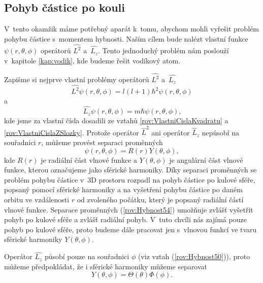 \subsection{Pohyb částice po kouli}
\label{kap:PohybCasticePoKouli}

V~tento okamžik máme potřebný aparát k~tomu, abychom mohli vyřešit problém pohybu částice s~momentem hybnosti. Naším cílem bude nalézt vlastní funkce $\psi(r, \theta, \phi)$ operátorů $\hat{L^2}$ a~$\hat{L_z}$. Tento jednoduchý problém nám poslouží  v~kapitole \ref{kap:vodik}, kde budeme řešit vodíkový atom.

Zapišme si nejprve vlastní problémy operátorů $\hat{L^2}$ a~$\hat{L_z}$
\begin{equation}
\hat{L^2}\psi(r, \theta, \phi) = l(l+1) \hbar^2 \psi(r, \theta, \phi)
\label{rov:Hybnost52}
\end{equation}
a
\begin{equation}
\hat{L_z}\psi(r, \theta, \phi) = m \hbar \psi(r, \theta, \phi) \mbox{,}
\label{rov:Hybnost53}
\end{equation}
kde jsme za vlastní čísla dosadili ze vztahů \eqref{rov:VlastniCislaKvadratu} a \eqref{rov:VlastniCislaZSlozky}. Protože operátor $\hat{L}^2$ ani operátor $\hat{L}_z$ nepůsobí na souřadnici $r$, můžeme provést separaci proměnných
\begin{equation}
\psi(r, \theta, \phi) = R(r) Y (\theta, \phi),
\label{rov:Hybnost54}
\end{equation}
kde $R(r)$ je radiální část vlnové funkce a $Y(\theta,\phi)$ je angulární část vlnové funkce, kterou označujeme jako sférické harmoniky. Díky separaci proměnných se problém pohybu částice v~3D prostoru rozpadl na pohyb částice po kulové sféře, popsaný pomocí sférické harmoniky a na vyšetření pohybu částice po daném orbitu ve vzdálenosti $r$ od zvoleného počátku, který je popsaný radiální částí vlnové funkce. Separace proměnných (\ref{rov:Hybnost54}) umožňuje zvlášť vyšetřit pohyb po kulové sféře a zvlášť radiální pohyb. V~tuto chvíli nás zajímá pouze pohyb po kulové sféře, proto budeme dále pracovat jen s~vlnovou funkcí ve tvaru sférické harmoniky $Y(\theta, \phi)$.

Operátor $\hat{L_z}$ působí pouze na souřadnici $\phi$ (viz vztah (\ref{rov:Hybnost50})), proto můžeme předpokládat, že i sférické harmoniky můžeme separovat
\begin{equation}
Y(\theta, \phi) = \Theta (\theta) \Phi (\phi) \mbox{.}
\label{rov:Hybnost55}
\end{equation}

